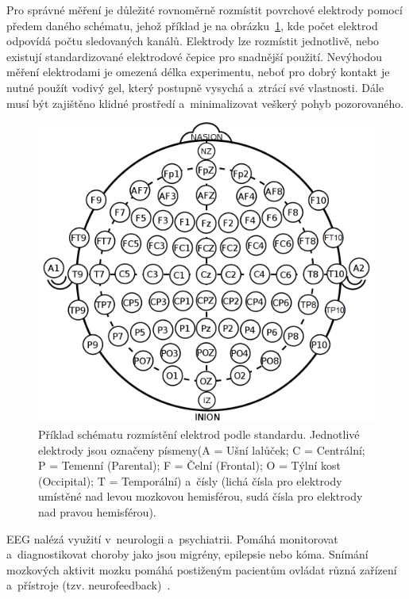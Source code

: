         Pro správné měření je důležité rovnoměrně rozmístit povrchové elektrody pomocí předem daného schématu, jehož příklad je na obrázku~\ref{fig:eeg_scheme}, kde počet elektrod odpovídá počtu sledovaných kanálů. Elektrody lze rozmístit jednotlivě, nebo existují standardizované elektrodové čepice pro snadnější použití. Nevýhodou měření elektrodami je omezená délka experimentu, neboť pro dobrý kontakt je nutné použít vodivý gel, který postupně vysychá a~ztrácí své vlastnosti. Dále musí být zajištěno klidné prostředí a~minimalizovat veškerý pohyb pozorovaného.
        
        \begin{figure}[H]
            \centering
            \includegraphics[width=\textwidth]{obrazky-figures/eeg_scheme.png}
            \caption{Příklad schématu rozmístění elektrod podle standardu. Jednotlivé elektrody jsou označeny písmeny(A = Ušní lalůček; C = Centrální; P = Temenní (Parental); F = Čelní (Frontal); O = Týlní kost (Occipital); T = Temporální) a~čísly (lichá čísla pro elektrody umístěné nad levou mozkovou hemisférou, sudá čísla pro elektrody nad pravou hemisférou).~\cite{wiki_eeg} }
            \label{fig:eeg_scheme}
        \end{figure}
            
        EEG nalézá využití v~neurologii a~psychiatrii. Pomáhá monitorovat a~diagnostikovat choroby jako jsou migrény, epilepsie nebo kóma. Snímání mozkových aktivit mozku pomáhá postiženým pacientům ovládat různá zařízení a~přístroje (tzv. neurofeedback)~\cite{wiki_eeg}.
        
